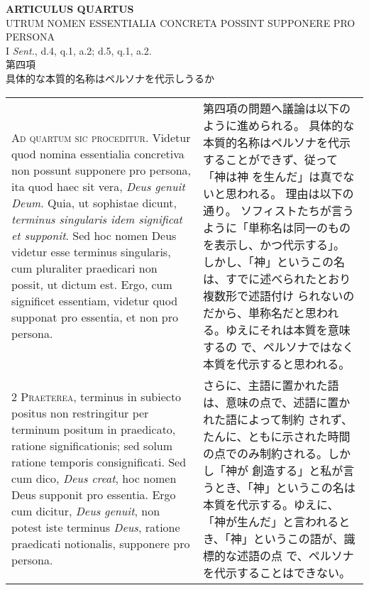 \documentclass[10pt]{jsarticle} %
\begin{document}
\begin{center}
 {\Large {\bf ARTICULUS QUARTUS}}\\
 {\large UTRUM NOMEN ESSENTIALIA CONCRETA POSSINT SUPPONERE PRO PERSONA}\\
 {\footnotesize I {\itshape Sent.}, d.4, q.1, a.2; d.5, q.1, a.2.}\\
 {\Large 第四項\\具体的な本質的名称はペルソナを代示しうるか}
\end{center}

\begin{longtable}{p{21em}p{21em}}





{\Huge A}{\scshape d quartum sic proceditur}. Videtur quod nomina essentialia concretiva
non possunt supponere pro persona, ita quod haec sit vera, {\itshape Deus genuit
Deum}. Quia, ut sophistae dicunt, {\itshape terminus singularis idem significat et
supponit}. Sed hoc nomen Deus videtur esse terminus singularis, cum
pluraliter praedicari non possit, ut dictum est. Ergo, cum significet
essentiam, videtur quod supponat pro essentia, et non pro persona.

&

第四項の問題へ議論は以下のように進められる。
具体的な本質的名称はペルソナを代示することができず、従って「神は神
を生んだ」は真でないと思われる。
理由は以下の通り。
ソフィストたちが言うように「単称名は同一のものを表示し、かつ代示する」。
 しかし、「神」というこの名は、すでに述べられたとおり複数形で述語付け
 られないのだから、単称名だと思われる。ゆえにそれは本質を意味するの
 で、ペルソナではなく本質を代示すると思われる。



\\



2 {\scshape Praeterea}, terminus in subiecto positus non restringitur per terminum
positum in praedicato, ratione significationis; sed solum ratione
temporis consignificati. Sed cum dico, {\itshape Deus creat}, hoc nomen Deus
supponit pro essentia. Ergo cum dicitur, {\itshape Deus genuit}, non potest iste
terminus {\itshape Deus}, ratione praedicati notionalis, supponere pro persona.

&

さらに、主語に置かれた語は、意味の点で、述語に置かれた語によって制約
 されず、たんに、ともに示された時間の点でのみ制約される。しかし「神が
 創造する」と私が言うとき、「神」というこの名は本質を代示する。ゆえに、
 「神が生んだ」と言われるとき、「神」というこの語が、識標的な述語の点
 で、ペルソナを代示することはできない。



\end{longtable}
\end{document}
